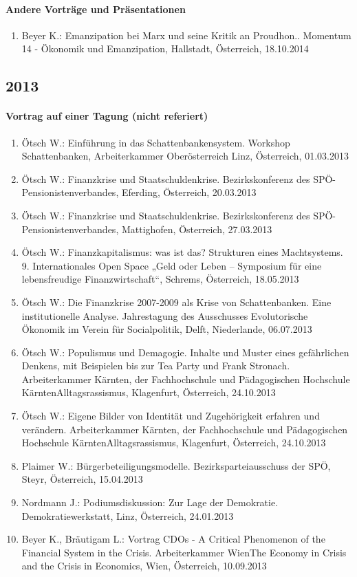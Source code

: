 \paragraph{Andere Vorträge und Präsentationen}
\begin{enumerate}
	\item Beyer K.: Emanzipation bei Marx und seine Kritik an Proudhon.. Momentum 14 - Ökonomik und Emanzipation, Hallstadt, Österreich, 18.10.2014
\end{enumerate}
\subsection*{2013}

    \paragraph{Vortrag auf einer Tagung (nicht referiert)}
\begin{enumerate}
	\item Ötsch W.: Einführung in das Schattenbankensystem. Workshop Schattenbanken, Arbeiterkammer Oberösterreich Linz, Österreich, 01.03.2013
	\item Ötsch W.: Finanzkrise und Staatschuldenkrise. Bezirkskonferenz des SPÖ-Pensionistenverbandes, Eferding, Österreich, 20.03.2013
	\item Ötsch W.: Finanzkrise und Staatschuldenkrise. Bezirkskonferenz des SPÖ-Pensionistenverbandes, Mattighofen, Österreich, 27.03.2013
	\item Ötsch W.: Finanzkapitalismus: was ist das? Strukturen eines Machtsystems. 9. Internationales Open Space „Geld oder Leben – Symposium für eine lebensfreudige Finanzwirtschaft“, Schrems, Österreich, 18.05.2013
	\item Ötsch W.: Die Finanzkrise 2007-2009 als Krise von Schattenbanken. Eine institutionelle Analyse. Jahrestagung des Ausschusses Evolutorische Ökonomik im Verein für Socialpolitik, Delft, Niederlande, 06.07.2013
	\item Ötsch W.: Populismus und Demagogie. Inhalte und Muster eines gefährlichen Denkens, mit Beispielen bis zur Tea Party und Frank Stronach. Arbeiterkammer Kärnten, der Fachhochschule und Pädagogischen Hochschule KärntenAlltagsrassismus, Klagenfurt, Österreich, 24.10.2013
	\item Ötsch W.: Eigene Bilder von Identität und Zugehörigkeit erfahren und verändern. Arbeiterkammer Kärnten, der Fachhochschule und Pädagogischen Hochschule KärntenAlltagsrassismus, Klagenfurt, Österreich, 24.10.2013
	\item Plaimer W.: Bürgerbeteiligungsmodelle. Bezirksparteiausschuss der SPÖ, Steyr, Österreich, 15.04.2013
	\item Nordmann J.: Podiumsdiskussion: Zur Lage der Demokratie. Demokratiewerkstatt, Linz, Österreich, 24.01.2013
	\item Beyer K., Bräutigam L.: Vortrag CDOs - A Critical Phenomenon of the Financial System in the Crisis. Arbeiterkammer WienThe Economy in Crisis and the Crisis in Economics, Wien, Österreich, 10.09.2013
\end{enumerate}
